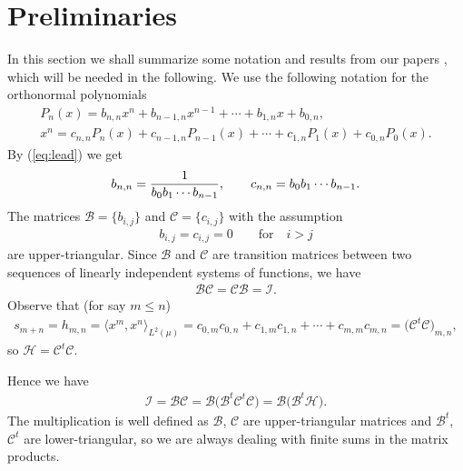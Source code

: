 \documentclass[pdftex]{sigma}
\numberwithin{equation}{section}
\begin{document}
\section{Preliminaries}\label{section2}
In this section we shall summarize some notation and results from our papers \cite{B:S1,B:S2,B:S3}, which will be needed in the following. We use the following notation for the orthonormal polynomials
\begin{gather}%
P_n(x)=b_{n,n}x^n+b_{n-1,n}x^{n-1}+\cdots + b_{1,n}x+b_{0,n},\nonumber\\
x^n=c_{n,n}P_n(x)+c_{n-1,n}P_{n-1}(x)+\cdots + c_{1,n}P_1(x)+c_{0,n}P_0(x).\label{eq:x}
\end{gather}
By (\ref{eq:lead}) we get
\begin{gather}\label{eq:b_n} b_{n,n}={1\over b_0b_1\cdots b_{n-1}},\qquad c_{n,n}=b_0b_1\cdots b_{n-1}.
\end{gather}
The matrices $\mathcal B=\{b_{i,j}\}$ and $\mathcal C=\{c_{i,j}\}$ with the assumption
\begin{gather*}
b_{i,j}=c_{i,j}=0\qquad \text{for} \quad i>j
\end{gather*}
 are upper-triangular. Since $\mathcal B$ and $\mathcal C$ are transition matrices between two sequences of linearly independent systems of functions, we have
\begin{gather*}
\mathcal B\mathcal C=\mathcal C\mathcal B=\mathcal I.
\end{gather*}
Observe that (for say $m\le n$)
\begin{gather*}s_{m+n} = h_{m,n}=\big\langle x^m,x^n\big\rangle_{L^2(\mu)} = c_{0,m}c_{0,n}+c_{1,m}c_{1,n}+\cdots +c_{m,m}c_{m,n} =\big(\mathcal C^t \mathcal C\big)_{m,n},
\end{gather*}
so $\mathcal{H}=\mathcal C^t \mathcal C$.

Hence we have
\begin{gather}\label{eq:I=B(B^tH)}
\mathcal I=\mathcal B\mathcal C=\mathcal B\big(\mathcal B^t\mathcal C^t\mathcal C\big)=\mathcal B\big(\mathcal B^t\mathcal{H}\big).
\end{gather}
The multiplication is well defined as $\mathcal B$, $\mathcal C$ are upper-triangular matrices and $\mathcal B^t$, $\mathcal C^t$ are lower-triangular, so we are always dealing with finite sums in the matrix products.
\end{document}
